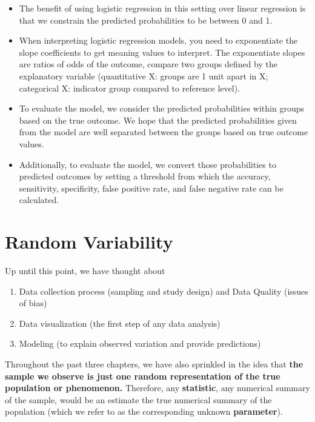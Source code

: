 \documentclass[
]{book}
\providecommand{\tightlist}{%
  \setlength{\itemsep}{0pt}\setlength{\parskip}{0pt}}
\begin{document}
\begin{itemize}
\tightlist
\item
  The benefit of using logistic regression in this setting over linear regression is that we constrain the predicted probabilities to be between 0 and 1.
\item
  When interpreting logistic regression models, you need to exponentiate the slope coefficients to get meaning values to interpret. The exponentiate slopes are ratios of odds of the outcome, compare two groups defined by the explanatory variable (quantitative X: groups are 1 unit apart in X; categorical X: indicator group compared to reference level).
\item
  To evaluate the model, we consider the predicted probabilities within groups based on the true outcome. We hope that the predicted probabilities given from the model are well separated between the groups based on true outcome values.
\item
  Additionally, to evaluate the model, we convert those probabilities to predicted outcomes by setting a threshold from which the accuracy, sensitivity, specificity, false positive rate, and false negative rate can be calculated.
\end{itemize}

\chapter{Random Variability}\label{randvariability}

Up until this point, we have thought about

\begin{enumerate}
\def\labelenumi{\arabic{enumi}.}
\tightlist
\item
  Data collection process (sampling and study design) and Data Quality (issues of bias)
\item
  Data visualization (the first step of any data analysis)
\item
  Modeling (to explain observed variation and provide predictions)
\end{enumerate}

Throughout the past three chapters, we have also sprinkled in the idea that \textbf{the sample we observe is just one random representation of the true population or phenomenon.} Therefore, any \textbf{statistic}, any numerical summary of the sample, would be an estimate the true numerical summary of the population (which we refer to as the corresponding unknown \textbf{parameter}).
\end{document}

